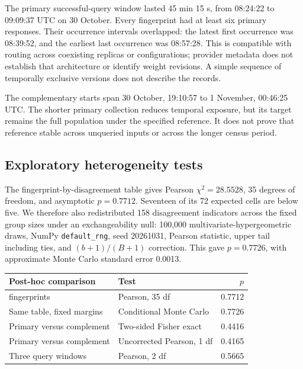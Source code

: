 \documentclass[
  10pt,
]{article}
\begin{document}
The primary successful-query window lasted 45 min 15 s, from 08:24:22 to
09:09:37 UTC on 30 October. Every fingerprint had at least six primary
responses. Their occurrence intervals overlapped: the latest first
occurrence was 08:39:52, and the earliest last occurrence was 08:57:28.
This is compatible with routing across coexisting replicas or
configurations; provider metadata does not establish that architecture
or identify weight revisions. A simple sequence of temporally exclusive
versions does not describe the records.

The complementary starts span 30 October, 19:10:57 to 1 November,
00:46:25 UTC. The shorter primary collection reduces temporal exposure,
but its target remains the full population under the specified
reference. It does not prove that reference stable across unqueried
inputs or across the longer census period.

\hypertarget{exploratory-heterogeneity-tests}{%
\subsection{Exploratory heterogeneity
tests}\label{exploratory-heterogeneity-tests}}

The fingerprint-by-disagreement table gives Pearson \(\chi^2=28.5528\),
35 degrees of freedom, and asymptotic \(p=0.7712\). Seventeen of its 72
expected cells are below five. We therefore also redistributed 158
disagreement indicators across the fixed group sizes under an
exchangeability null: 100,000 multivariate-hypergeometric draws, NumPy
\texttt{default\_rng}, seed 20261031, Pearson statistic, upper tail
including ties, and \((b+1)/(B+1)\) correction. This gave \(p=0.7726\),
with approximate Monte Carlo standard error 0.0013.

\begin{longtable}[]{@{}llr@{}}
\toprule\noalign{}
Post-hoc comparison & Test & \(p\) \\
\midrule\noalign{}
\endhead
\bottomrule\noalign{}
\endlastfoot
36 fingerprints & Pearson, 35 df & 0.7712 \\
Same table, fixed margins & Conditional Monte Carlo & 0.7726 \\
Primary versus complement & Two-sided Fisher exact & 0.4416 \\
Primary versus complement & Uncorrected Pearson, 1 df & 0.4165 \\
Three query windows & Pearson, 2 df & 0.5665 \\
\end{longtable}
\end{document}
